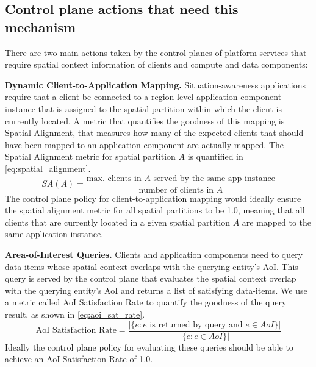 \subsection{Control plane actions that need this mechanism}
There are two main actions taken by the control planes of platform services that require spatial context information of clients and compute and data components:
\par \noindent \textbf{Dynamic Client-to-Application Mapping. } Situation-awareness applications require that a client be connected to a region-level application component instance that is assigned to the spatial partition within which the client is currently located. A metric that quantifies the goodness of this mapping is Spatial Alignment, that measures how many of the expected clients that should have been mapped to an application component are actually mapped. The Spatial Alignment metric for spatial partition $A$ is quantified in \cref{eq:spatial_alignment}.
\begin{equation}
SA \left( A \right) = \dfrac{\text{max. clients in }A\text{ served by the same app instance}}{\text{number of clients in }A}
\label{eq:spatial_alignment}
\end{equation}
The control plane policy for client-to-application mapping would ideally ensure the spatial alignment metric for all spatial partitions to be 1.0, meaning that all clients that are currently located in a given spatial partition $A$ are mapped to the same application instance.

\par \noindent \textbf{Area-of-Interest Queries. } Clients and application components need to query data-items whose spatial context overlaps with the querying entity's AoI. This query is served by the control plane that evaluates the spatial context overlap with the querying entity's AoI and returns a list of satisfying data-items. We use a metric called AoI Satisfaction Rate to quantify the goodness of the query result, as shown in \cref{eq:aoi_sat_rate}.
\begin{equation}
\text{AoI Satisfaction Rate} = \dfrac{|\{ e: e \text{ is returned by query  and } e \in AoI \}|}{|\{ e: e \in AoI \}|}
\label{eq:aoi_sat_rate}
\end{equation}
Ideally the control plane policy for evaluating these queries should be able to achieve an AoI Satisfaction Rate of 1.0.

